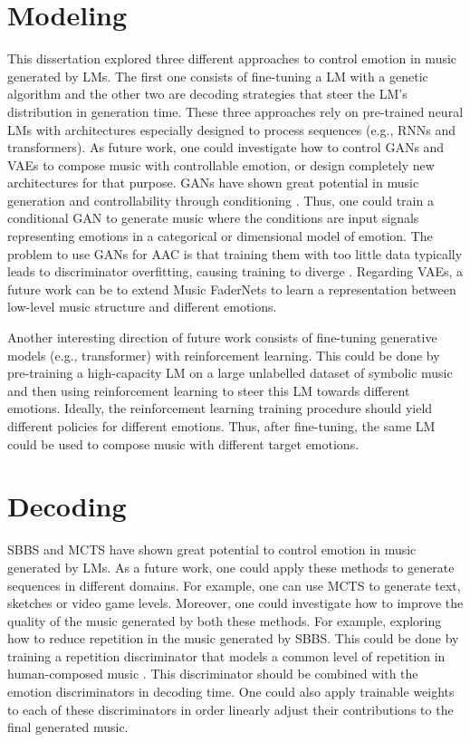 \section{Modeling}

This dissertation explored three different approaches to control emotion in music generated by LMs. The first one consists of fine-tuning a LM with a genetic algorithm and the other two are decoding strategies that steer the LM's distribution in generation time. These three approaches rely on pre-trained neural LMs with architectures especially designed to process sequences (e.g., RNNs and transformers). As future work, one could investigate how to control GANs and VAEs to compose music with controllable emotion, or design completely new architectures for that purpose. GANs have shown great potential in music generation \cite{muhamed2021symbolic} and controllability through conditioning \cite{}. Thus, one could train a conditional GAN to generate music where the conditions are input signals representing emotions in a categorical or dimensional model of emotion. The problem to use GANs for AAC is that training them with too little data typically leads to discriminator overfitting, causing training to diverge \cite{karras2020training}. Regarding VAEs, a future work can be to extend Music FaderNets \cite{tan2020music} to learn a representation between low-level music structure and different emotions.

Another interesting direction of future work consists of fine-tuning generative models (e.g., transformer) with reinforcement learning. This could be done by pre-training a high-capacity LM on a large unlabelled dataset of symbolic music and then using reinforcement learning to steer this LM towards different emotions. Ideally, the reinforcement learning training procedure should yield different policies for different emotions. Thus, after fine-tuning, the same LM could be used to compose music with different target emotions.

\section{Decoding}

SBBS and MCTS have shown great potential to control emotion in music generated by LMs. As a future work, one could apply these methods to generate sequences in different domains. For example, one can use MCTS to generate text, sketches or video game levels. Moreover, one could investigate how to improve the quality of the music generated by both these methods. For example, exploring how to reduce repetition in the music generated by SBBS. This could be done by training a repetition discriminator that models a common level of repetition in human-composed music \cite{holtzman2018learning}. This discriminator should be combined with the emotion discriminators in decoding time. One could also apply trainable weights to each of these discriminators in order linearly adjust their contributions to the final generated music.

